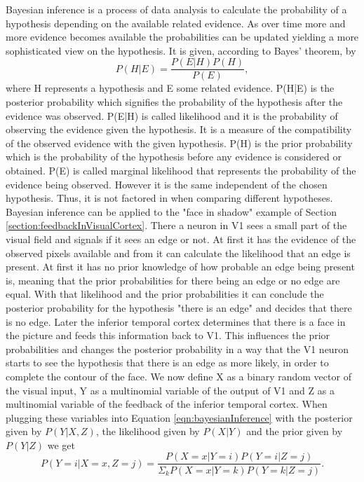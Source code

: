 Bayesian inference is a process of data analysis to calculate the probability of a hypothesis depending on the available related evidence. As over time more and more evidence becomes available the probabilities can be updated yielding a more sophisticated view on the hypothesis. It is given, according to Bayes' theorem, by
\begin{equation}
\label{eqn:bayesianInference}
P(H|E) = \frac{P(E|H)P(H)}{P(E)},
\end{equation}
where H represents a hypothesis and E some related evidence. P(H|E) is the posterior probability which signifies the probability of the hypothesis after the evidence was observed. P(E|H) is called likelihood and it is the probability of observing the evidence 	given the hypothesis. It is a measure of the compatibility of the observed evidence with the given hypothesis. P(H) is the prior probability which is the probability of the hypothesis before any evidence is considered or obtained. P(E) is called marginal likelihood that represents the probability of the evidence being observed. However it is the same independent of the chosen hypothesis. Thus, it is not factored in when comparing different hypotheses.
Bayesian inference can be applied to the "face in shadow" example of Section \ref{section:feedbackInVisualCortex}. There a neuron in V1 sees a small part of the visual field and signals if it sees an edge or not. At first it has the evidence of the observed pixels available and from it can calculate the likelihood that an edge is present. At first it has no prior knowledge of how probable an edge being present is, meaning that the prior probabilities for there being an edge or no edge are equal. With that likelihood and the prior probabilities it can conclude the posterior probability for the hypothesis "there is an edge" and decides that there is no edge.
Later the inferior temporal cortex determines that there is a face in the picture and feeds this information back to V1. This influences the prior probabilities and changes the posterior probability in a way that the V1 neuron starts to see the hypothesis that there is an edge as more likely, in order to complete the contour of the face. 
We now define X as a binary random vector of the visual input, Y as a multinomial variable of the output of V1 and Z as a multinomial variable of the feedback of the inferior temporal cortex.
When plugging these variables into Equation \ref{eqn:bayesianInference} with the posterior given by $P(Y|X,Z)$, the likelihood given by $P(X|Y)$ and the prior given by $P(Y|Z)$ we get
\begin{equation}
\label{eqn:pYvorausgesetztXUndZ}
P(Y = i|X = x, Z = j) = \frac{P(X=x|Y=i)P(Y = i|Z = j)}{\Sigma_{k}P(X=x|Y=k)P(Y=k|Z=j)}.
\end{equation}


